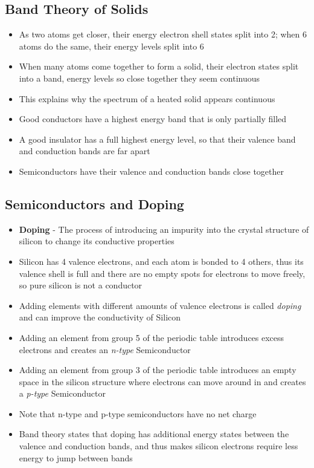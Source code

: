 \subsection{Band Theory of Solids}
\begin{itemize}
    \item As two atoms get closer, their energy electron shell states split into 2; when 6 atoms do the same, their energy levels split into 6
    \item When many atoms come together to form a solid, their electron states split into a band, energy levels so close together they seem continuous
    \item This explains why the spectrum of a heated solid appears continuous
    \item Good conductors have a highest energy band that is only partially filled
    \item A good insulator has a full highest energy level, so that their valence band and conduction bands are far apart
    \item Semiconductors have their valence and conduction bands close together
\end{itemize}

\subsection{Semiconductors and Doping}
\begin{itemize}
    \item \textbf{Doping} - The process of introducing an impurity into the crystal structure of silicon to change its conductive properties
    \item Silicon has 4 valence electrons, and each atom is bonded to 4 others, thus its valence shell is full and there are no empty spots for electrons to move freely, so pure silicon is not a conductor
    \item Adding elements with different amounts of valence electrons is called \emph{doping} and can improve the conductivity of Silicon
    \item Adding an element from group 5 of the periodic table introduces excess electrons and creates an \emph{n-type} Semiconductor
    \item Adding an element from group 3 of the periodic table introduces an empty space in the silicon structure where electrons can move around in and creates a \emph{p-type} Semiconductor
    \item Note that n-type and p-type semiconductors have no net charge
    \item Band theory states that doping has additional energy states between the valence and conduction bands, and thus makes silicon electrons require less energy to jump between bands
\end{itemize}


